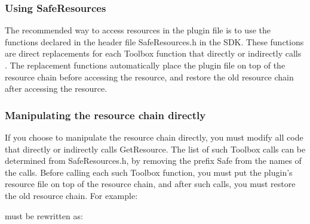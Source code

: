 \documentclass[letterpaper,12pt,english,openany,oneside]{sphinxmanual}
\begin{document}
\subsubsection{Using SafeResources}
\label{\detokenize{Plugins_CreatingSimplePlug:using-saferesources}}
The recommended way to access resources in the plugin file is to use the functions declared in the header file SafeResources.h in the SDK. These functions are direct replacements for each Toolbox function that directly or indirectly calls . The replacement functions automatically place the plugin file on top of the resource chain before accessing the resource, and restore the old resource chain after accessing the resource.


\subsubsection{Manipulating the resource chain directly}
\label{\detokenize{Plugins_CreatingSimplePlug:manipulating-the-resource-chain-directly}}
If you choose to manipulate the resource chain directly, you must modify all code that directly or indirectly calls GetResource. The list of such Toolbox calls can be determined from SafeResources.h, by removing the prefix Safe from the names of the calls. Before calling each such Toolbox function, you must put the plugin’s resource file on top of the resource chain, and after such calls, you must restore the old resource chain. For example:

\begin{sphinxVerbatim}[commandchars=\\\{\}]
      
\end{sphinxVerbatim}

must be rewritten as:

\begin{sphinxVerbatim}[commandchars=\\\{\}]
 
  
   
      
\end{sphinxVerbatim}
\end{document}
